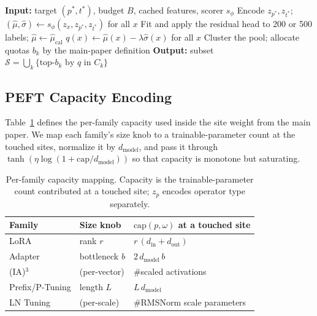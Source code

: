 \begin{algorithm}[t]
\caption{Online selection (per target)}
\label{alg:online}
\begin{algorithmic}[1]
\STATE \textbf{Input:} target $(p^{*},t^{*})$, budget $B$, cached features, scorer $s_\phi$
\STATE Encode $z_{p^{*}},z_{t^{*}}$;
  $(\widehat{\mu},\widehat{\sigma})\gets
  s_\phi(z_x,z_{p^{*}},z_{t^{*}})$ for all $x$
  \STATE Fit and apply the residual head to 200 or 500 labels;
    $\widehat{\mu}\gets\widehat{\mu}_{\mathrm{cal}}$
\ENDIF
\STATE $q(x)\gets\widehat{\mu}(x)-\lambda\widehat{\sigma}(x)$ for all $x$
\STATE Cluster the pool; allocate quotas $b_k$ by the main-paper definition
\STATE \textbf{Output:} subset $\mathcal{S}=\bigcup_k \{\text{top-}b_k \text{ by } q \text{ in } C_k\}$
\end{algorithmic}
\end{algorithm}

\subsection{PEFT Capacity Encoding}
\label{sec:appendix-capacity}

Table~\ref{tab:capacity} defines the per-family capacity used inside the site
weight from the main paper. We map each family's size knob to a
trainable-parameter count at the touched sites, normalize it by
$d_{\text{model}}$, and pass it through $\tanh(\eta\log(1+\mathrm{cap}/d_{\text{model}}))$
so that capacity is monotone but saturating.

\begin{table}[t]
\centering
\small
\setlength{\tabcolsep}{3pt}
\begin{tabular}{@{}lll@{}}
\toprule
Family & Size knob & $\mathrm{cap}(p,\omega)$ at a touched site \\
\midrule
LoRA      & rank $r$        & $r\,(d_{\text{in}}+d_{\text{out}})$ \\
Adapter   & bottleneck $b$  & $2\,d_{\text{model}}\,b$ \\
(IA)$^3$  & (per-vector)    & \#scaled activations \\
Prefix/P-Tuning & length $L$ & $L\,d_{\text{model}}$ \\
LN Tuning & (per-scale)     & \#RMSNorm scale parameters \\
\bottomrule
\end{tabular}
\caption{Per-family capacity mapping. Capacity is the trainable-parameter count
contributed at a touched site; $z_p$ encodes operator type separately.}
\label{tab:capacity}
\end{table}

